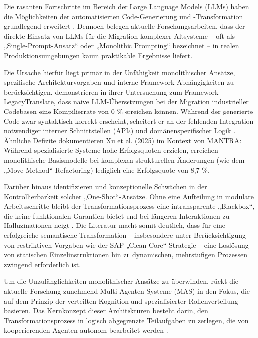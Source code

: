 Die rasanten Fortschritte im Bereich der Large Language Models (LLMs) haben die Möglichkeiten der 
automatisierten Code-Generierung und -Transformation grundlegend erweitert \parencite{karabiyikRefactorGPTChatGPTbasedMultiagent2025}. 
Dennoch belegen aktuelle Forschungsarbeiten, dass der direkte Einsatz von LLMs für die Migration 
komplexer Altsysteme – oft als „Single-Prompt-Ansatz“ oder „Monolithic Prompting“ bezeichnet – in 
realen Produktionsumgebungen kaum praktikable Ergebnisse liefert.

Die Ursache hierfür liegt primär in der Unfähigkeit monolithischer Ansätze, spezifische 
Architekturvorgaben und interne Framework-Abhängigkeiten zu berücksichtigen. \textcite{motiLegacyTranslateLLMbasedMultiAgent2026} 
demonstrieren in ihrer Untersuchung zum Framework LegacyTranslate, dass naive LLM-Übersetzungen 
bei der Migration industrieller Codebasen eine Kompilierrate von 0 \% erreichen können. Während der 
generierte Code zwar syntaktisch korrekt erscheint, scheitert er an der fehlenden Integration
notwendiger interner Schnittstellen (APIs) und domänenspezifischer Logik \parencite{motiLegacyTranslateLLMbasedMultiAgent2026}. 
Ähnliche Defizite dokumentieren Xu et al. (2025) im Kontext von MANTRA: Während spezialisierte 
Systeme hohe Erfolgsquoten erzielen, erreichen monolithische Basismodelle bei komplexen 
strukturellen Änderungen (wie dem „Move Method“-Refactoring) lediglich eine Erfolgsquote von 8,7 \%.

Darüber hinaus identifizieren \textcite{karabiyikRefactorGPTChatGPTbasedMultiagent2025} und 
\textcite{oueslatiRefAgentMultiagentLLMbased2026} konzeptionelle Schwächen 
in der Kontrollierbarkeit solcher „One-Shot“-Ansätze. Ohne eine Aufteilung in modulare 
Arbeitsschritte bleibt der Transformationsprozess eine intransparente „Blackbox“, die keine 
funktionalen Garantien bietet und bei längeren Interaktionen zu Halluzinationen neigt 
\parencite{oueslatiRefAgentMultiagentLLMbased2026,karabiyikRefactorGPTChatGPTbasedMultiagent2025}. Die Literatur macht somit deutlich, dass für eine 
erfolgreiche semantische Transformation – insbesondere unter Berücksichtigung von restriktiven 
Vorgaben wie der SAP „Clean Core“-Strategie – eine Loslösung von statischen Einzelinstruktionen hin 
zu dynamischen, mehrstufigen Prozessen zwingend erforderlich ist.

Um die Unzulänglichkeiten monolithischer Ansätze zu überwinden, rückt die aktuelle Forschung 
zunehmend Multi-Agenten-Systeme (MAS) in den Fokus, die auf dem Prinzip der verteilten Kognition 
und spezialisierter Rollenverteilung basieren. Das Kernkonzept dieser Architekturen besteht darin, 
den Transformationsprozess in logisch abgegrenzte Teilaufgaben zu zerlegen, die von kooperierenden 
Agenten autonom bearbeitet werden \parencite{oueslatiRefAgentMultiagentLLMbased2026,karabiyikRefactorGPTChatGPTbasedMultiagent2025}.

